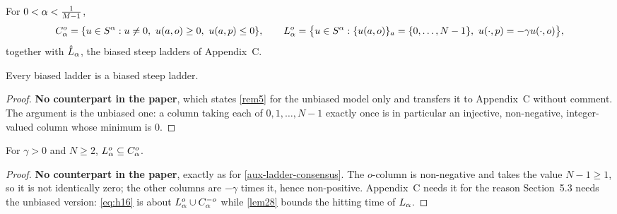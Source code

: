 \begin{definition}
  \label{eq8}
  \leanok
  For $0 < \alpha < \tfrac{1}{M-1}$,
  \[
    C_\alpha^o = \{ u \in S^\alpha : u \ne 0,\ u(a,o) \ge 0,\ u(a,p) \le 0 \},
    \qquad
    L_\alpha^o = \bigl\{ u \in S^\alpha :
      \{u(a,o)\}_a = \{0,\dots,N-1\},\ u(\cdot,p) = -\gamma u(\cdot,o) \bigr\},
  \]
  together with $\hat{L}_\alpha$, the biased steep ladders of Appendix~C.
\end{definition}

\begin{remark}[$\ladder_\alpha \subset \steep_\alpha$]
  \label{aux-biased-ladder-steep}
  \leanok
  Every biased ladder is a biased steep ladder.
\end{remark}
\begin{proof}
  \leanok
  \textbf{No counterpart in the paper}, which states \ref{rem5} for the
  unbiased model only and transfers it to Appendix~C without comment.  The
  argument is the unbiased one: a column taking each of $0, 1, \dots, N-1$
  exactly once is in particular an injective, non-negative, integer-valued
  column whose minimum is $0$.
\end{proof}

\begin{lemma}
  \label{aux-biased-ladder-consensus}
  \leanok
  For $\gamma > 0$ and $N \ge 2$, $L_\alpha^o \subseteq C_\alpha^o$.
\end{lemma}
\begin{proof}
  \leanok
  \textbf{No counterpart in the paper}, exactly as for
  \ref{aux-ladder-consensus}.  The $o$-column is non-negative and takes the
  value $N-1 \ge 1$, so it is not identically zero; the other columns are
  $-\gamma$ times it, hence non-positive.  Appendix~C needs it for the reason
  Section~5.3 needs the unbiased version: \eqref{eq:h16} is about
  $L_\alpha^o \cup C_\alpha^{-o}$ while \ref{lem28} bounds the hitting
  time of $L_\alpha$.
\end{proof}

